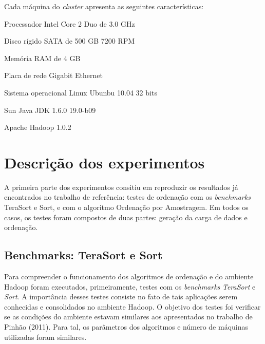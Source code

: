 
Cada máquina do \textit{cluster} apresenta as seguintes características:
\begin{packed_enum}
\item Processador Intel Core 2 Duo de 3.0 GHz
\item Disco rígido SATA de 500 GB 7200 RPM
\item Memória RAM de 4 GB
\item Placa de rede Gigabit Ethernet
\item Sistema operacional Linux Ubunbu 10.04 32 bits %
\item Sun Java JDK 1.6.0 19.0-b09 
\item Apache Hadoop 1.0.2
\end{packed_enum}


\section{Descrição dos experimentos}

A primeira parte dos experimentos consitiu em reproduzir os resultados já encontrados no trabalho de referência: testes de ordenação com os \textit{benchmarks} TeraSort e Sort, e com o algoritmo Ordenação por Amostragem. 
Em todos os casos, os testes foram compostos de duas partes: geração da carga de dados e ordenação. 

\subsection{Benchmarks: TeraSort e Sort}

 
Para compreender o funcionamento dos algoritmos de ordenação e do ambiente Hadoop foram executados, primeiramente, testes com os \textit{benchmarks} \textit{TeraSort} e \textit{Sort}.  A importância desses testes consiste no fato de tais  aplicações serem conhecidas e consolidados no ambiente Hadoop. 
 O objetivo dos testes foi verificar se as condições do ambiente estavam similares aos apresentados no trabalho de Pinhão (2011). Para tal, os parâmetros dos algoritmos e número de máquinas utilizadas foram similares. 


